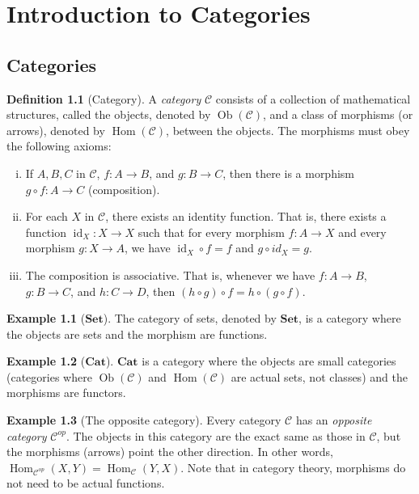 \documentclass[12pt]{book}
\theoremstyle{definition}
\newtheorem{definition}{Definition}[section]
\newtheorem{defexample}{Example}[definition]
\theoremstyle{plain}
\theoremstyle{definition}
\DeclareMathOperator{\id}{id}
\DeclareMathOperator{\ob}{Ob}
\DeclareMathOperator{\Hom}{Hom}
\begin{document}
\chapter{Introduction to Categories}

\section{Categories}
\begin{definition}[Category]
  A \emph{category} $\mathscr{C}$ consists of a collection of mathematical structures, called the objects, denoted by $\ob(\mathscr{C})$, and a class of morphisms (or arrows), denoted by $\Hom(\mathscr{C})$,  between the objects. The morphisms must obey the following axioms:
  \begin{enumerate}[i.]
    \item If $A, B, C$ in $\mathscr{C}$, $f : A \rightarrow B$, and $g : B \rightarrow C$, then there is a morphism $g \circ f : A \rightarrow C$ (composition).
    \item For each $X$ in $\mathscr{C}$, there exists an identity function. That is, there exists a function  $\id_X : X \rightarrow X$ such that for every morphism $f : A \rightarrow X$ and every morphism $g : X \rightarrow A$, we have $\id_X \circ f = f$ and $g \circ id_X = g$.
    \item The composition is associative. That is, whenever we have $f : A \rightarrow B$, $g : B \rightarrow C$, and $h : C \rightarrow D$, then $(h \circ g) \circ f = h \circ (g \circ f)$.
  \end{enumerate}
\end{definition}

\begin{defexample}[$\mathbf{Set}$]
  The category of sets, denoted by $\mathbf{Set}$, is a category where the objects are sets and the morphism are functions.
\end{defexample}

\begin{defexample}[$\mathbf{Cat}$]
  $\mathbf{Cat}$ is a category where the objects are small categories (categories where $\ob(\mathscr{C})$ and $\Hom(\mathscr{C})$ are actual sets, not classes) and the morphisms are functors.
\end{defexample}

\begin{defexample}[The opposite category]
  Every category $\mathscr{C}$ has an \emph{opposite category} $\mathscr{C}^{op}$. The objects in this category are the exact same as those in $\mathscr{C}$, but the morphisms (arrows) point the other direction. In other words, $\Hom_{\mathscr{C}^{op}}(X, Y) = \Hom_\mathscr{C}(Y, X)$. Note that in category theory, morphisms do not need to be actual functions.
\end{defexample}
\end{document}
